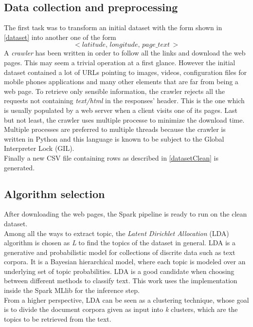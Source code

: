 \documentclass{sig-alternate-05-2015}
\begin{document}
\subsection{Data collection and preprocessing}\label{preprocessing}
The first task was to transform an initial dataset with the form shown in \ref{dataset} into another one of the form
\begin{equation}\label{datasetClean}
    <latitude,\,longitude,\,page\_text\,>
\end{equation}
A \emph{crawler} has been written in order to follow all the links and download the web pages. This may seem a trivial operation at a first glance. However the initial dataset contained a lot of URLs pointing to images, videos, configuration files for mobile phones applications and many other elements that are far from being a web page. To retrieve only sensible information, the crawler rejects all the requests not containing \emph{text/html} in the responses' header. This is the one which is usually populated by a web server when a client visits one of its pages. Last but not least, the crawler uses multiple processe to minimize the download time. Multiple processes are preferred to multiple threads because the crawler is written in Python and this language is known to be subject to the Global Interpreter Lock\cite{gil} (GIL).\\
Finally a new CSV file containing rows as described in \ref{datasetClean} is generated.
\subsection{Algorithm selection}
After downloading the web pages, the Spark pipeline is ready to run on the clean dataset.\\
Among all the ways to extract topic, the \emph{Latent Dirichlet Allocation}\cite{lda} (LDA) algorithm is chosen as \emph{L} to find the topics of the dataset in general. LDA is a generative and probabilistic model for collections of discrite data such as text corpora. It is a Bayesian hierarchical model, where each topic is modeled over an underlying set of topic probabilities. LDA is a good candidate when choosing between different methods to classify text. This work uses the implementation inside the Spark MLlib for the inference step.\\
From a higher perspective, LDA can be seen as a clustering technique, whose goal is to divide the document corpora given as input into \emph{k} clusters, which are the topics to be retrieved from the text.
\end{document}
